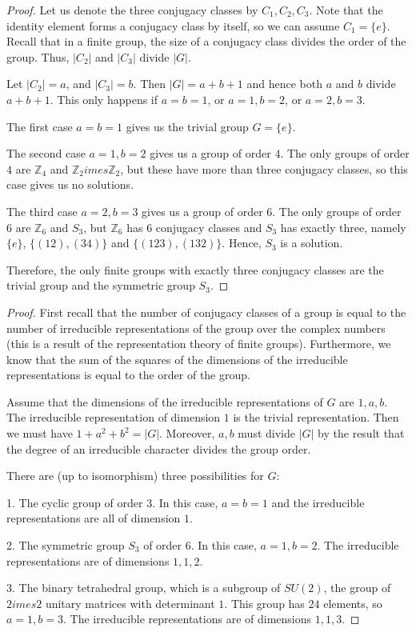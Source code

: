 \documentclass{amsart}
\theoremstyle{plain}
\begin{document}
\begin{proof}Let us denote the three conjugacy classes by $C_1, C_2, C_3$. Note that the identity element forms a conjugacy class by itself, so we can assume $C_1 = \{e\}$.  Recall that in a finite group, the size of a conjugacy class divides the order of the group. Thus, $|C_2|$ and $|C_3|$ divide $|G|$.

Let $|C_2| = a$, and $|C_3| = b$. Then $|G| = a + b + 1$ and hence both $a$ and $b$ divide $a + b + 1$. This only happens if $a = b = 1$, or $a = 1, b = 2$, or $a = 2, b = 3$. 

The first case $a = b = 1$ gives us the trivial group $G = \{e\}$.

The second case $a = 1, b = 2$ gives us a group of order $4$. The only groups of order $4$ are $\mathbb{Z}_4$ and $\mathbb{Z}_2 	imes \mathbb{Z}_2$, but these have more than three conjugacy classes, so this case gives us no solutions.

The third case $a = 2, b = 3$ gives us a group of order $6$. The only groups of order $6$ are $\mathbb{Z}_6$ and $S_3$, but $\mathbb{Z}_6$ has $6$ conjugacy classes and $S_3$ has exactly three, namely $\{e\}$, $\{(12),(34)\}$ and $\{(123),(132)\}$. Hence, $S_3$ is a solution.

Therefore, the only finite groups with exactly three conjugacy classes are the trivial group and the symmetric group $S_3$.
\end{proof}

\begin{proof}First recall that the number of conjugacy classes of a group is equal to the number of irreducible representations of the group over the complex numbers (this is a result of the representation theory of finite groups). Furthermore, we know that the sum of the squares of the dimensions of the irreducible representations is equal to the order of the group. 

Assume that the dimensions of the irreducible representations of $G$ are $1, a, b$. The irreducible representation of dimension $1$ is the trivial representation. Then we must have $1 + a^2 + b^2 = |G|$. Moreover, $a, b$ must divide $|G|$ by the result that the degree of an irreducible character divides the group order. 

There are (up to isomorphism) three possibilities for $G$:

1. The cyclic group of order $3$. In this case, $a=b=1$ and the irreducible representations are all of dimension $1$.

2. The symmetric group $S_3$ of order $6$. In this case, $a=1, b=2$. The irreducible representations are of dimensions $1, 1, 2$.

3. The binary tetrahedral group, which is a subgroup of $SU(2)$, the group of $2	imes 2$ unitary matrices with determinant $1$. This group has $24$ elements, so $a=1, b=3$. The irreducible representations are of dimensions $1, 1, 3$.
\end{proof}
\end{document}
